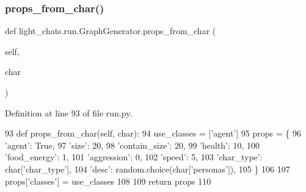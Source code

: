 \mbox{\label{classlight__chats_1_1run_1_1GraphGenerator_a3b33b3e258b5d31a586a43b484bda91c}} 
\subsubsection{\texorpdfstring{props\+\_\+from\+\_\+char()}{props\_from\_char()}}
{\footnotesize\ttfamily def light\+\_\+chats.\+run.\+Graph\+Generator.\+props\+\_\+from\+\_\+char (\begin{DoxyParamCaption}\item[{}]{self,  }\item[{}]{char }\end{DoxyParamCaption})}



Definition at line 93 of file run.\+py.


\begin{DoxyCode}
93     \textcolor{keyword}{def }props\_from\_char(self, char):
94         use\_classes = [\textcolor{stringliteral}{'agent'}]
95         props = \{
96             \textcolor{stringliteral}{'agent'}: \textcolor{keyword}{True},
97             \textcolor{stringliteral}{'size'}: 20,
98             \textcolor{stringliteral}{'contain\_size'}: 20,
99             \textcolor{stringliteral}{'health'}: 10,
100             \textcolor{stringliteral}{'food\_energy'}: 1,
101             \textcolor{stringliteral}{'aggression'}: 0,
102             \textcolor{stringliteral}{'speed'}: 5,
103             \textcolor{stringliteral}{'char\_type'}: char[\textcolor{stringliteral}{'char\_type'}],
104             \textcolor{stringliteral}{'desc'}: random.choice(char[\textcolor{stringliteral}{'personas'}]),
105         \}
106 
107         props[\textcolor{stringliteral}{'classes'}] = use\_classes
108 
109         \textcolor{keywordflow}{return} props
110 
\end{DoxyCode}
\mbox{\label{classlight__chats_1_1run_1_1GraphGenerator_a757544b95a6b132d89a0e27dc98511f4}} 
